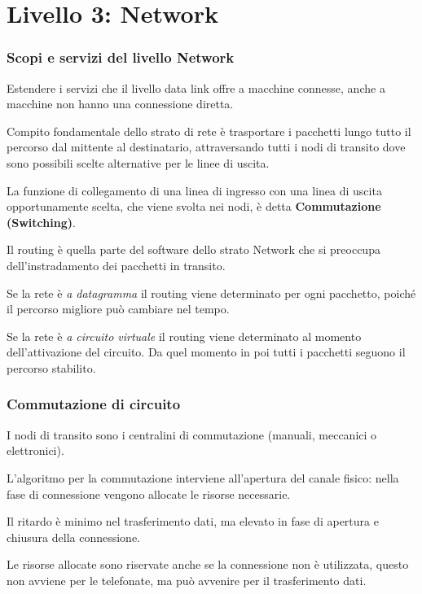 \section{Livello 3: Network}
        \subsubsection{Scopi e servizi del livello Network}
            Estendere i servizi che il livello data link offre a macchine connesse, anche a macchine non hanno una connessione diretta.

            Compito fondamentale dello strato di rete è trasportare i pacchetti lungo tutto il percorso dal mittente al destinatario, attraversando tutti i nodi di transito dove sono possibili scelte alternative per le linee di uscita.

            La funzione di collegamento di una linea di ingresso con una linea di uscita opportunamente scelta, che viene svolta nei nodi, è detta \textbf{Commutazione (Switching)}.

            Il routing è quella parte del software dello strato Network che si preoccupa dell'instradamento dei pacchetti in transito.

            Se la rete è \textit{a datagramma} il routing viene determinato per ogni pacchetto, poiché il percorso migliore può cambiare nel tempo.

            Se la rete è \textit{a circuito virtuale} il routing viene determinato al momento dell'attivazione del circuito. Da quel momento in poi tutti i pacchetti seguono il percorso stabilito.

        \subsubsection{Commutazione di circuito}
            I nodi di transito sono i centralini di commutazione (manuali, meccanici o elettronici).
        
            L'algoritmo per la commutazione interviene all'apertura del canale fisico: nella fase di connessione vengono allocate le risorse necessarie.
        
            Il ritardo è minimo nel trasferimento dati, ma elevato in fase di apertura e chiusura della connessione.
        
            Le risorse allocate sono riservate anche se la connessione non è utilizzata, questo non avviene per le telefonate, ma può avvenire per il trasferimento dati.


